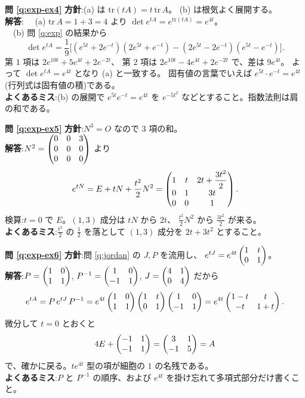 \bigskip
\noindent\textbf{問 \ref{q:exp-ex4}}\quad
\textbf{方針}:(a) は $\mathrm{tr}(tA) = t\,\mathrm{tr}\,A$。
(b) は根気よく展開する。\\
\textbf{解答}:
　(a) $\mathrm{tr}\,A = 1 + 3 = 4$ より
$\det e^{tA} = e^{\mathrm{tr}(tA)} = e^{4t}$。\\
　(b) 問 \ref{q:exp} の結果から
\[
\det e^{tA} = \frac{1}{9}\bigl[(e^{5t} + 2e^{-t})(2e^{5t} + e^{-t})
- (2e^{5t} - 2e^{-t})(e^{5t} - e^{-t})\bigr].
\]
第 $1$ 項は $2e^{10t} + 5e^{4t} + 2e^{-2t}$、
第 $2$ 項は $2e^{10t} - 4e^{4t} + 2e^{-2t}$ で、差は $9e^{4t}$。
よって $\det e^{tA} = e^{4t}$ となり (a) と一致する。
固有値の言葉でいえば $e^{5t} \cdot e^{-t} = e^{4t}$
(行列式は固有値の積)である。\\
\textbf{よくあるミス}:(b) の展開で $e^{5t}e^{-t} = e^{4t}$ を
$e^{-5t^2}$ などとすること。指数法則は肩の和である。

\bigskip
\noindent\textbf{問 \ref{q:exp-ex5}}\quad
\textbf{方針}:$N^3 = O$ なので $3$ 項の和。\\
\textbf{解答}:$N^2 = \begin{pmatrix}0 & 0 & 3 \\ 0 & 0 & 0 \\ 0 & 0 & 0\end{pmatrix}$ より
\[
e^{tN} = E + tN + \frac{t^2}{2}N^2
= \begin{pmatrix}1 & t & 2t + \dfrac{3t^2}{2} \\ 0 & 1 & 3t \\ 0 & 0 & 1\end{pmatrix}.
\]
検算:$t = 0$ で $E$。$(1,3)$ 成分は $tN$ から $2t$、
$\frac{t^2}{2}N^2$ から $\frac{3t^2}{2}$ が来る。\\
\textbf{よくあるミス}:$\frac{t^2}{2}$ の $\frac{1}{2}$ を落として
$(1,3)$ 成分を $2t + 3t^2$ とすること。

\bigskip
\noindent\textbf{問 \ref{q:exp-ex6}}\quad
\textbf{方針}:問 \ref{q:jordan} の $J, P$ を流用し、
$e^{tJ} = e^{4t}\begin{pmatrix}1 & t \\ 0 & 1\end{pmatrix}$。\\
\textbf{解答}:$P = \begin{pmatrix}1 & 0 \\ 1 & 1\end{pmatrix}$, $P^{-1} = \begin{pmatrix}1 & 0 \\ -1 & 1\end{pmatrix}$,
$J = \begin{pmatrix}4 & 1 \\ 0 & 4\end{pmatrix}$ だから
\[
e^{tA} = P\,e^{tJ}\,P^{-1}
= e^{4t}\begin{pmatrix}1 & 0 \\ 1 & 1\end{pmatrix}\begin{pmatrix}1 & t \\ 0 & 1\end{pmatrix}\begin{pmatrix}1 & 0 \\ -1 & 1\end{pmatrix}
= e^{4t}\begin{pmatrix}1 - t & t \\ -t & 1 + t\end{pmatrix}.
\]
微分して $t = 0$ とおくと
\[
4E + \begin{pmatrix}-1 & 1 \\ -1 & 1\end{pmatrix} = \begin{pmatrix}3 & 1 \\ -1 & 5\end{pmatrix} = A
\]
で、確かに戻る。$te^{4t}$ 型の項が細胞の $1$ の名残である。\\
\textbf{よくあるミス}:$P$ と $P^{-1}$ の順序、および
$e^{4t}$ を掛け忘れて多項式部分だけ書くこと。

